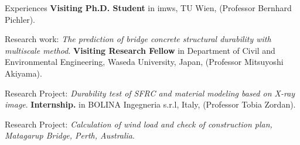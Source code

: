 \begin{rubric}{Experiences}
%
	\textbf{Visiting Ph.D. Student} in imws, TU Wien, (Professor Bernhard Pichler).
	\par Research work: \emph{The prediction of bridge concrete structural durability with multiscale method}.
%
%
\entry*[2019 -- 2020]%
	\textbf{Visiting Research Fellow} in Department of Civil and Environmental Engineering, Waseda University, Japan, (Professor Mitsuyoshi Akiyama).
	\par Research Project: \emph{Durability test of SFRC and material modeling based on X-ray image}.
% 
\entry*[2016 -- 2016]%
	\textbf{Internship.} in BOLINA Ingegneria s.r.l, Italy, (Professor Tobia Zordan).
	\par Research Project: \emph{Calculation of wind load and check of construction plan, Matagarup
	Bridge, Perth, Australia}.
%
\end{rubric}